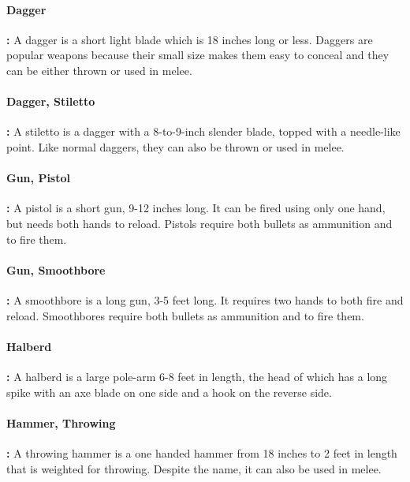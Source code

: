 \begin{multicols*}{2}
\paragraph{Dagger}\textbf{:} A dagger is a short light blade which is 18 inches long or less. Daggers are popular weapons because their small size makes them easy to conceal and they can be either thrown or used in melee.

\paragraph{Dagger, Stiletto}\textbf{:} A stiletto is a dagger with a 8-to-9-inch slender blade, topped with a needle-like point. Like normal daggers, they can also be thrown or used in melee.

\paragraph{Gun, Pistol}\textbf{:} A pistol is a short gun, 9-12 inches long. It can be fired using only one hand, but needs both hands to reload. Pistols require both bullets as ammunition and  to fire them.

\paragraph{Gun, Smoothbore}\textbf{:} A smoothbore is a long gun, 3-5 feet long. It requires two hands to both fire and reload. Smoothbores require both bullets as ammunition and  to fire them.

\paragraph{Halberd}\textbf{:} A halberd is a large pole-arm 6-8 feet in length, the head of which has a long spike with an axe blade on one side and a hook on the reverse side.

\paragraph{Hammer, Throwing}\textbf{:} A throwing hammer is a one handed hammer from 18 inches to 2 feet in length that is weighted for throwing. Despite the name, it can also be used in melee.


\end{multicols*}
